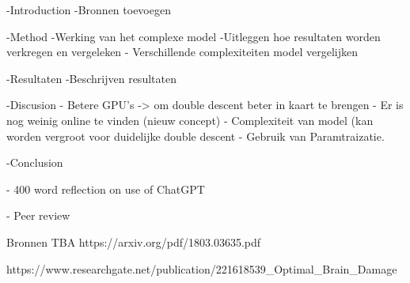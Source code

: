 -Introduction
    -Bronnen toevoegen

-Method
    -Werking van het complexe model
    -Uitleggen hoe resultaten worden verkregen en vergeleken
        - Verschillende complexiteiten model vergelijken 

-Resultaten
    -Beschrijven resultaten

-Discusion
    - Betere GPU’s -> om double descent beter in kaart te brengen
    - Er is nog weinig online te vinden (nieuw concept)
    - Complexiteit van model (kan worden vergroot voor      duidelijke double descent
        - Gebruik van Paramtraizatie.

-Conclusion

- 400 word reflection on use of ChatGPT

- Peer review

Bronnen TBA
https://arxiv.org/pdf/1803.03635.pdf

https://www.researchgate.net/publication/221618539_Optimal_Brain_Damage